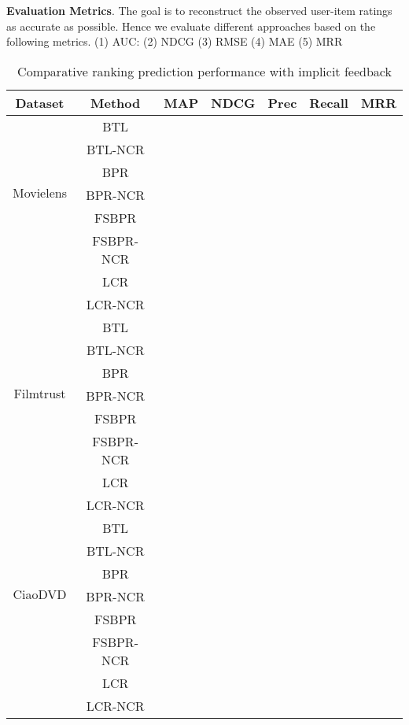 \documentclass[letterpaper]{article} %
\begin{document}
\textbf{Evaluation Metrics}.  The goal is to reconstruct the observed user-item ratings as accurate as possible. Hence we evaluate different approaches based on the following metrics. (1) AUC: (2) NDCG (3) RMSE (4) MAE (5) MRR

\begin{table}[htp]
\tiny
\caption{Comparative ranking prediction performance with implicit feedback}
\begin{center}
\begin{tabular}{|c|c|c|c|c|c|c|}
\hline
Dataset & Method & MAP & NDCG & Prec & Recall & MRR \\\hline
\multirow{6}{*}{Movielens} & BTL & & & & & \\\cline{2-7}
 & BTL-NCR & & & & & \\\cline{2-7}
 & BPR & & & & & \\\cline{2-7}
 & BPR-NCR & & & & & \\\cline{2-7}
 & FSBPR & & & & & \\\cline{2-7}
  & FSBPR-NCR & & & & & \\\cline{2-7}
   & LCR & & & & & \\\cline{2-7}
 & LCR-NCR & & & & & \\\hline
\multirow{6}{*}{Filmtrust} & BTL & & & & & \\\cline{2-7}
 & BTL-NCR & & & & & \\\cline{2-7}
 & BPR & & & & & \\\cline{2-7}
 & BPR-NCR & & & & & \\\cline{2-7}
 & FSBPR & & & & & \\\cline{2-7}
  & FSBPR-NCR & & & & & \\\cline{2-7}
   & LCR & & & & & \\\cline{2-7}
 & LCR-NCR & & & & & \\\hline
\multirow{6}{*}{CiaoDVD} & BTL & & & & & \\\cline{2-7}
 & BTL-NCR & & & & & \\\cline{2-7}
 & BPR & & & & & \\\cline{2-7}
 & BPR-NCR & & & & & \\\cline{2-7}
 & FSBPR & & & & & \\\cline{2-7}
  & FSBPR-NCR & & & & & \\\cline{2-7}
   & LCR & & & & & \\\cline{2-7}
 & LCR-NCR & & & & & \\\hline
\end{tabular}
\end{center}
\label{tab:ratingresult}
\end{table}%
\end{document}
